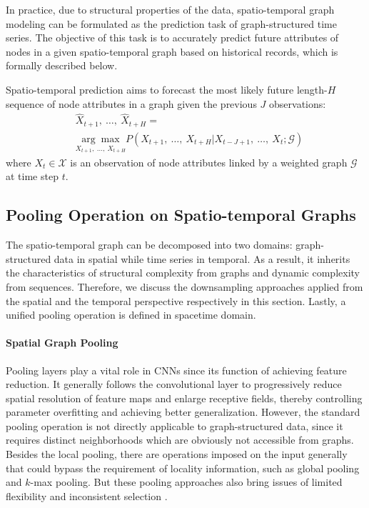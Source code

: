 \documentclass[sigconf,screen]{acmart}
\begin{document}
In practice, due to structural properties of the data, spatio-temporal graph modeling can be formulated as the prediction task of graph-structured time series. The objective of this task is to accurately predict future attributes of nodes in a given spatio-temporal graph based on historical records, which is formally described below.

\begin{definition} 
Spatio-temporal prediction aims to forecast the most likely future length-$H$ sequence of node attributes in a graph given the previous $J$ observations:
\begin{equation}
\begin{aligned}
& \hat {X}_{t + 1},~\ldots,~\hat {X}_{t + H} = \\
& \underset {X_{t + 1},~\ldots,~X_{t + H}} {\arg \max} P \left(X_{t + 1},~\ldots,~X_{t + H} | X_{t - J + 1},~\ldots,~X_{t}; \mathcal{G} \right)
\end{aligned}
\end{equation}
where $X_t \in \mathcal{X} $ is an observation of node attributes linked by a weighted graph $\mathcal{G}$ at time step $t$.
\end{definition}

\subsection{Pooling Operation on Spatio-temporal Graphs}
The spatio-temporal graph can be decomposed into two domains: graph-structured data in spatial while time series in temporal. As a result, it inherits the characteristics of structural complexity from graphs and dynamic complexity from sequences. Therefore, we discuss the downsampling approaches applied from the spatial and the temporal perspective respectively in this section. Lastly, a unified pooling operation is defined in spacetime domain.

\paragraph{Spatial Graph Pooling}
Pooling layers play a vital role in CNNs since its function of achieving feature reduction. It generally follows the convolutional layer to progressively reduce spatial resolution of feature maps and enlarge receptive fields, thereby controlling parameter overfitting and achieving better generalization. However, the standard pooling operation is not directly applicable to graph-structured data, since it requires distinct neighborhoods which are obviously not accessible from graphs. Besides the local pooling, there are operations imposed on the input generally that could bypass the requirement of locality information, such as global pooling and $k$-max pooling. But these pooling approaches also bring issues of limited flexibility and inconsistent selection \cite{gao2019graph}. 
\end{document}

